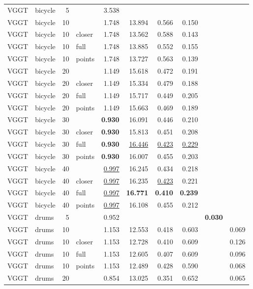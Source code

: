 \begin{table}[H]
\begin{tabular}{llrlrrrrrr}
\midrule
VGGT & bicycle & 5 &  & 3.538 &  &  &  &  &  \\
VGGT & bicycle & 10 &  & 1.748 & 13.894 & 0.566 & 0.150 &  &  \\
VGGT & bicycle & 10 & closer & 1.748 & 13.562 & 0.588 & 0.143 &  &  \\
VGGT & bicycle & 10 & full & 1.748 & 13.885 & 0.552 & 0.155 &  &  \\
VGGT & bicycle & 10 & points & 1.748 & 13.727 & 0.563 & 0.139 &  &  \\
VGGT & bicycle & 20 &  & 1.149 & 15.618 & 0.472 & 0.191 &  &  \\
VGGT & bicycle & 20 & closer & 1.149 & 15.334 & 0.479 & 0.188 &  &  \\
VGGT & bicycle & 20 & full & 1.149 & 15.717 & 0.449 & 0.205 &  &  \\
VGGT & bicycle & 20 & points & 1.149 & 15.663 & 0.469 & 0.189 &  &  \\
VGGT & bicycle & 30 &  & \textbf{0.930} & 16.091 & 0.446 & 0.210 &  &  \\
VGGT & bicycle & 30 & closer & \textbf{0.930} & 15.813 & 0.451 & 0.208 &  &  \\
VGGT & bicycle & 30 & full & \textbf{0.930} & \underline{16.446} & \underline{0.423} & \underline{0.229} &  &  \\
VGGT & bicycle & 30 & points & \textbf{0.930} & 16.007 & 0.455 & 0.203 &  &  \\
VGGT & bicycle & 40 &  & \underline{0.997} & 16.245 & 0.434 & 0.218 &  &  \\
VGGT & bicycle & 40 & closer & \underline{0.997} & 16.235 & \underline{0.423} & 0.221 &  &  \\
VGGT & bicycle & 40 & full & \underline{0.997} & \textbf{16.771} & \textbf{0.410} & \textbf{0.239} &  &  \\
VGGT & bicycle & 40 & points & \underline{0.997} & 16.108 & 0.455 & 0.212 &  &  \\
\midrule
VGGT & drums & 5 &  & 0.952 &  &  &  & \textbf{0.030} &  \\
VGGT & drums & 10 &  & 1.153 & 12.553 & 0.418 & 0.603 &  & 0.069 \\
VGGT & drums & 10 & closer & 1.153 & 12.728 & 0.410 & 0.609 &  & 0.126 \\
VGGT & drums & 10 & full & 1.153 & 12.605 & 0.407 & 0.609 &  & 0.096 \\
VGGT & drums & 10 & points & 1.153 & 12.489 & 0.428 & 0.590 &  & 0.068 \\
VGGT & drums & 20 &  & 0.854 & 13.025 & 0.351 & 0.652 &  & 0.065 \\

\end{tabular}
\end{table}

